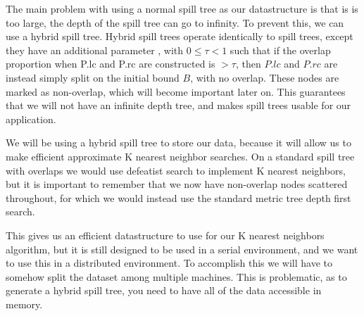 \vspace{5 mm}
\noindent
The main problem with using a normal spill tree as our datastructure is that is 
\tau is too large, the depth of the spill tree can go to infinity.  To prevent 
this, we can use a hybrid spill tree.  Hybrid spill trees operate identically to 
spill trees, except they have an additional parameter \rho, with $0 \le \tau < 1$ 
such that if the overlap proportion when P.lc and P.rc are constructed is 
$> \tau$, then $P.lc$ and $P.rc$ are instead simply split on the initial bound 
$B$, with no overlap.  These nodes are marked as non-overlap, which will become 
important later on.  This guarantees that we will not have an infinite depth 
tree, and makes spill trees usable for our application.

\vspace{5 mm}
\noindent
We will be using a hybrid spill tree to store our data, because it will allow us 
to make efficient approximate K nearest neighbor searches.  On a standard spill 
tree with overlaps we would use defeatist search to implement K nearest neighbors, 
but it is important to remember that we now have non-overlap nodes scattered 
throughout, for which we would instead use the standard metric tree depth first 
search. %

\vspace{5 mm}
\noindent
This gives us an efficient datastructure to use for our K nearest neighbors algorithm, but it is still designed to be used in a serial environment, and we want to use this in a distributed environment.  To accomplish this we will have to somehow split the dataset among multiple machines.  This is problematic, as to generate a hybrid spill tree, you need to have all of the data accessible in memory.  


